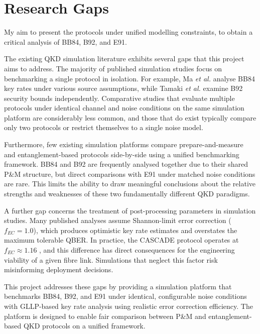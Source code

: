 \documentclass[10pt, a4paper]{report}
\begin{document}
\section{Research Gaps}
My aim to present the protocols under unified modelling constraints, to obtain a critical analysis of BB84, B92, and E91.

The existing QKD simulation literature exhibits several gaps that this project aims to address. The majority of published simulation studies focus on benchmarking a single protocol in isolation. For example, Ma \textit{et al.} \cite{Ma2005} analyse BB84 key rates under various source assumptions, while Tamaki \textit{et al.} \cite{Tamaki2014} examine B92 security bounds independently. Comparative studies that evaluate multiple protocols under identical channel and noise conditions on the same simulation platform are considerably less common, and those that do exist typically compare only two protocols or restrict themselves to a single noise model.

Furthermore, few existing simulation platforms compare prepare-and-measure and entanglement-based protocols side-by-side using a unified benchmarking framework. BB84 and B92 are frequently analysed together due to their shared P\&M structure, but direct comparisons with E91 under matched noise conditions are rare. This limits the ability to draw meaningful conclusions about the relative strengths and weaknesses of these two fundamentally different QKD paradigms.

A further gap concerns the treatment of post-processing parameters in simulation studies. Many published analyses assume Shannon-limit error correction ($f_{EC} = 1.0$), which produces optimistic key rate estimates and overstates the maximum tolerable QBER. In practice, the CASCADE protocol operates at $f_{EC} \approx 1.16$ \cite{Cascade1994}, and this difference has direct consequences for the engineering viability of a given fibre link. Simulations that neglect this factor risk misinforming deployment decisions.

This project addresses these gaps by providing a simulation platform that benchmarks BB84, B92, and E91 under identical, configurable noise conditions with GLLP-based key rate analysis using realistic error correction efficiency. The platform is designed to enable fair comparison between P\&M and entanglement-based QKD protocols on a unified framework.
\end{document}
